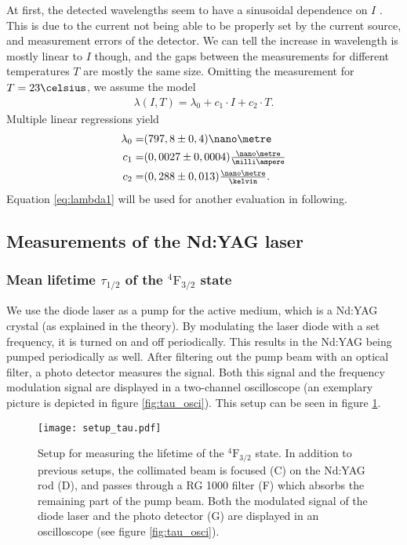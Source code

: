 At first, the detected wavelengths seem to have a sinusoidal dependence on $I$ . This is due to the current not being able to be properly set by the current source, and measurement errors of the detector. We can tell the increase in wavelength is mostly linear to $I$ though, and the gaps between the measurements for different temperatures $T$ are mostly the same size.
Omitting the measurement for $T=23\celsius$, we assume the model
\begin{align}
\lambda(I,T)=\lambda_0+c_1\cdot I+c_2\cdot T.
\label{eq:lambda1}
\end{align}
Multiple linear regressions yield
\begin{align*}
\lambda_0=&(797,8\pm 0,4)\nano\metre\\
c_1=&(0,0027\pm 0,0004)\tfrac{\nano\metre}{\milli\ampere}\\
c_2=&(0,288\pm 0,013)\tfrac{\nano\metre}{\kelvin}.
\end{align*}
Equation \eqref{eq:lambda1} will be used for another evaluation in following.


\subsection{Measurements of the Nd:YAG laser} \label{sec:1064}
\subsubsection{Mean lifetime $\tau_{1/2}$ of the $^4\mathrm{F}_{3/2}$ state}
We use the diode laser as a pump for the active medium, which is a Nd:YAG crystal (as explained in the theory). By modulating the laser diode with a set frequency, it is turned on and off periodically. This results in the Nd:YAG being pumped periodically as well. After filtering out the pump beam with an optical filter, a photo detector measures the signal. Both this signal and the frequency modulation signal are displayed in a two-channel oscilloscope (an exemplary picture is depicted in figure \ref{fig:tau_osci}). This setup can be seen in figure \ref{fig:setup_tau}.

\begin{figure}[h]
	\centering
	\texttt{[image: setup\_tau.pdf]}
	\caption[Setup for measuring the lifetime of the $^4\mathrm{F}_{3/2}$ state]{Setup for measuring the lifetime of the $^4\mathrm{F}_{3/2}$ state. In addition to previous setups, the collimated beam is focused (C) on the Nd:YAG rod (D), and passes through a RG 1000 filter (F) which absorbs the remaining part of the pump beam. Both the modulated signal of the diode laser and the photo detector (G) are displayed in an oscilloscope (see figure \ref{fig:tau_osci}). \cite{lit:manual}}
	\label{fig:setup_tau}
\end{figure}

